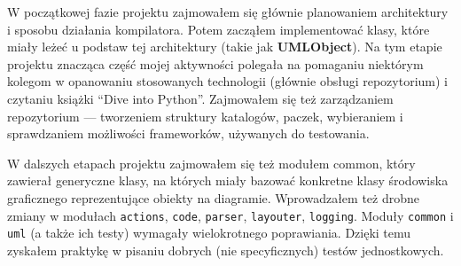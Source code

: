 W początkowej fazie projektu zajmowałem się głównie planowaniem architektury i sposobu działania kompilatora.
Potem zacząłem implementować klasy, które miały leżeć u podstaw tej architektury (takie jak \textbf{UMLObject}).
Na tym etapie projektu znacząca część mojej aktywności polegała na pomaganiu niektórym kolegom w opanowaniu stosowanych technologii (głównie obsługi repozytorium) i czytaniu książki ``Dive into Python''.
Zajmowałem się też zarządzaniem repozytorium --- tworzeniem struktury katalogów, paczek, wybieraniem i sprawdzaniem możliwości frameworków, używanych do testowania.

W dalszych etapach projektu zajmowałem się też modułem common, który zawierał generyczne klasy, na których miały bazować konkretne klasy środowiska graficznego reprezentujące obiekty na diagramie.
Wprowadzałem też drobne zmiany w modułach \texttt{actions}, \texttt{code}, \texttt{parser}, \texttt{layouter}, \texttt{logging}.
Moduły \texttt{common} i \texttt{uml} (a także ich testy) wymagały wielokrotnego poprawiania.
Dzięki temu zyskałem praktykę w pisaniu dobrych (nie specyficznych) testów jednostkowych.
